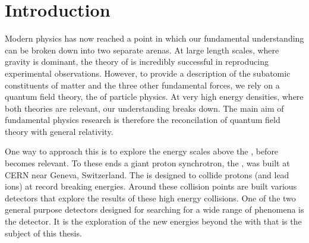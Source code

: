 \chapter{Introduction}
\label{chap:introduction}





Modern physics has now reached a point in which our fundamental
understanding can be broken down into two separate arenas. At large
length scales, where gravity is dominant, the theory of \GR is
incredibly successful in reproducing experimental observations.
However, to provide a description of the subatomic constituents of
matter and the three other fundamental forces, we rely on a quantum
field theory, the \SM of particle physics. At very high
energy densities, where both theories are relevant, our understanding
breaks down. The main aim of fundamental physics research is therefore
the reconcilation of quantum field theory with general relativity. 

One way to approach this is to explore the energy scales above the
\SM, before \GR becomes relevant. To these ends a giant proton
synchrotron, the \LHC, was built at CERN near Geneva, Switzerland. The
\LHC is designed to collide protons (and lead ions) at record breaking
energies. Around these collision points are built various detectors
that explore the results of these high energy collisions. One of the
two general purpose detectors designed for searching for a wide range
of phenomena is the \CMS detector.  It is the exploration of the new
energies beyond the \SM with \CMS that is the subject of this thesis.

